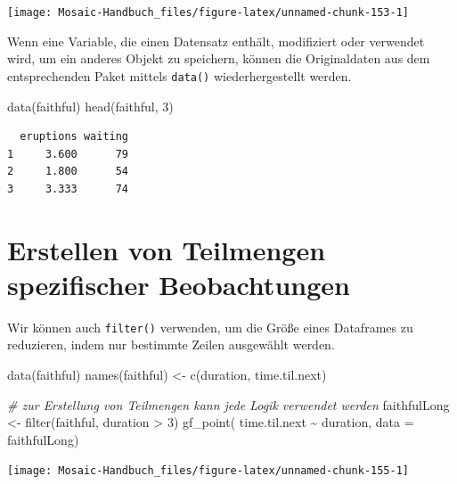 \documentclass[
  ngerman,
]{scrbook}
\newenvironment{Shaded}{\begin{snugshade}}{\end{snugshade}}
\newcommand{\AttributeTok}[1]{\textcolor[rgb]{0.77,0.63,0.00}{#1}}
\newcommand{\CommentTok}[1]{\textcolor[rgb]{0.56,0.35,0.01}{\textit{#1}}}
\newcommand{\DecValTok}[1]{\textcolor[rgb]{0.00,0.00,0.81}{#1}}
\newcommand{\FunctionTok}[1]{\textcolor[rgb]{0.00,0.00,0.00}{#1}}
\newcommand{\NormalTok}[1]{#1}
\newcommand{\OtherTok}[1]{\textcolor[rgb]{0.56,0.35,0.01}{#1}}
\newcommand{\SpecialCharTok}[1]{\textcolor[rgb]{0.00,0.00,0.00}{#1}}
\newcommand{\StringTok}[1]{\textcolor[rgb]{0.31,0.60,0.02}{#1}}
\begin{document}
\begin{center}\texttt{[image: Mosaic-Handbuch\_files/figure-latex/unnamed-chunk-153-1]} \end{center}

Wenn eine Variable, die einen Datensatz enthält, modifiziert oder verwendet wird, um ein anderes Objekt zu speichern, können die Originaldaten aus dem entsprechenden Paket mittels \texttt{data()} wiederhergestellt werden.

\begin{Shaded}
\begin{Highlighting}[]
\FunctionTok{data}\NormalTok{(faithful)}
\FunctionTok{head}\NormalTok{(faithful, }\DecValTok{3}\NormalTok{)}
\end{Highlighting}
\end{Shaded}

\begin{verbatim}
  eruptions waiting
1     3.600      79
2     1.800      54
3     3.333      74
\end{verbatim}

\hypertarget{subdaten}{%
\section{Erstellen von Teilmengen spezifischer Beobachtungen}\label{subdaten}}

Wir können auch \texttt{filter()} verwenden, um die Größe eines Dataframes zu reduzieren, indem nur bestimmte Zeilen ausgewählt werden.

\begin{Shaded}
\begin{Highlighting}[]
\FunctionTok{data}\NormalTok{(faithful)}
\FunctionTok{names}\NormalTok{(faithful) }\OtherTok{\textless{}{-}} \FunctionTok{c}\NormalTok{(}\StringTok{\textquotesingle{}duration\textquotesingle{}}\NormalTok{, }\StringTok{\textquotesingle{}time.til.next\textquotesingle{}}\NormalTok{)}

\CommentTok{\# zur Erstellung von Teilmengen kann jede Logik verwendet werden}
\NormalTok{faithfulLong }\OtherTok{\textless{}{-}} \FunctionTok{filter}\NormalTok{(faithful, duration }\SpecialCharTok{\textgreater{}} \DecValTok{3}\NormalTok{)}
\FunctionTok{gf\_point}\NormalTok{( time.til.next }\SpecialCharTok{\textasciitilde{}}\NormalTok{ duration, }\AttributeTok{data =}\NormalTok{ faithfulLong)}
\end{Highlighting}
\end{Shaded}

\begin{center}\texttt{[image: Mosaic-Handbuch\_files/figure-latex/unnamed-chunk-155-1]} \end{center}
\end{document}
